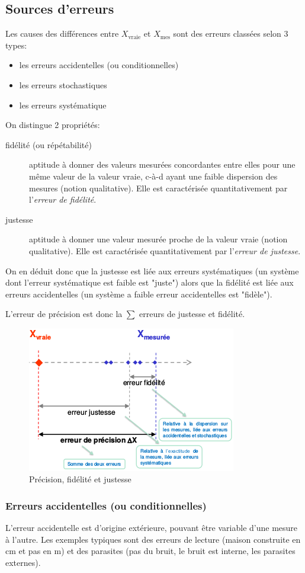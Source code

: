 \subsection{Sources d'erreurs}
Les causes des différences entre \(X_{\text{vraie}}\) et \(X_{\text{mes}}\) sont des erreurs classées selon 3 types:
\begin{itemize}
	\item les erreurs accidentelles (ou conditionnelles)
	\item les erreurs stochastiques
	\item les erreurs systématique
\end{itemize}
On distingue 2 propriétés:
\begin{description}
	\item[fidélité (ou répétabilité)] aptitude à donner des valeurs mesurées concordantes entre elles pour une même valeur de la valeur vraie, c-à-d ayant une faible dispersion des mesures (notion qualitative). Elle est caractérisée quantitativement par l'\emph{erreur de fidélité}. 
	\item[justesse] aptitude à donner une valeur mesurée proche de la valeur vraie (notion qualitative). Elle est caractérisée quantitativement par l'\emph{erreur de justesse}.
\end{description}
On en déduit donc que la justesse est liée aux erreurs systématiques (un système dont l'erreur systématique est faible est "juste") alors que la fidélité est liée aux erreurs accidentelles (un système a faible erreur accidentelles est "fidèle").

L'erreur de précision est donc la \(\sum\) erreurs de justesse et fidélité.
\begin{figure}[H]
	\centering 
	\includegraphics[width=.5\textwidth]{ch2/image5}
	\caption{Précision, fidélité et justesse}
\end{figure}
\subsubsection{Erreurs accidentelles (ou conditionnelles)}
L'erreur accidentelle est d'origine extérieure, pouvant être variable d'une mesure à l'autre. Les exemples typiques sont des erreurs de lecture (maison construite en cm et pas en m) et des parasites (\danger pas du bruit, le bruit est interne, les parasites externes).

